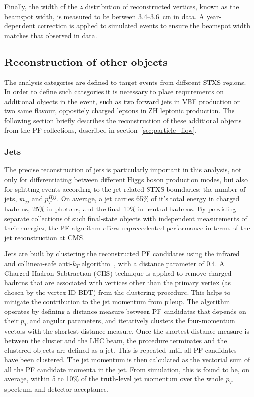 Finally, the width of the $z$ distribution of reconstructed vertices, known as the beamspot width, is measured to be between 3.4--3.6~cm in data. A year-dependent correction is applied to simulated events to ensure the beamspot width matches that observed in data.

\subsection{Reconstruction of other objects}\label{sec:hgg_otherobjects}
The analysis categories are defined to target events from different STXS regions. In order to define such categories it is necessary to place requirements on additional objects in the event, such as two forward jets in VBF production or two same flavour, oppositely charged leptons in ZH leptonic production. The following section briefly describes the reconstruction of these additional objects from the PF collections, described in section~\ref{sec:particle_flow}.

\subsubsection{Jets}
The precise reconstruction of jets is particularly important in this analysis, not only for differentiating between different Higgs boson production modes, but also for splitting events according to the jet-related STXS boundaries: the number of jets, $m_{jj}$ and $p_T^{Hjj}$. On average, a jet carries 65\% of it's total energy in charged hadrons, 25\% in photons, and the final 10\% in neutral hadrons. By providing separate collections of such final-state objects with independent measurements of their energies, the PF algorithm offers unprecedented performance in terms of the jet reconstruction at CMS. 

Jets are built by clustering the reconstructed PF candidates using the infrared and collinear-safe anti-$k_T$ algorithm~\cite{Cacciari:2008gp,Cacciari:2011ma}, with a distance parameter of 0.4. A Charged Hadron Subtraction (CHS) technique is applied to remove charged hadrons that are associated with vertices other than the primary vertex (as chosen by the vertex ID BDT) from the clustering procedure. This helps to mitigate the contribution to the jet momentum from pileup. The algorithm operates by defining a distance measure between PF candidates that depends on their $p_T$ and angular parameters, and iteratively clusters the four-momentum vectors with the shortest distance measure. Once the shortest distance measure is between the cluster and the LHC beam, the procedure terminates and the clustered objects are defined as a jet. This is repeated until all PF candidates have been clustered. The jet momentum is then calculated as the vectorial sum of all the PF candidate momenta in the jet. From simulation, this is found to be, on average, within 5 to 10\% of the truth-level jet momentum over the whole $p_T$ spectrum and detector acceptance.


